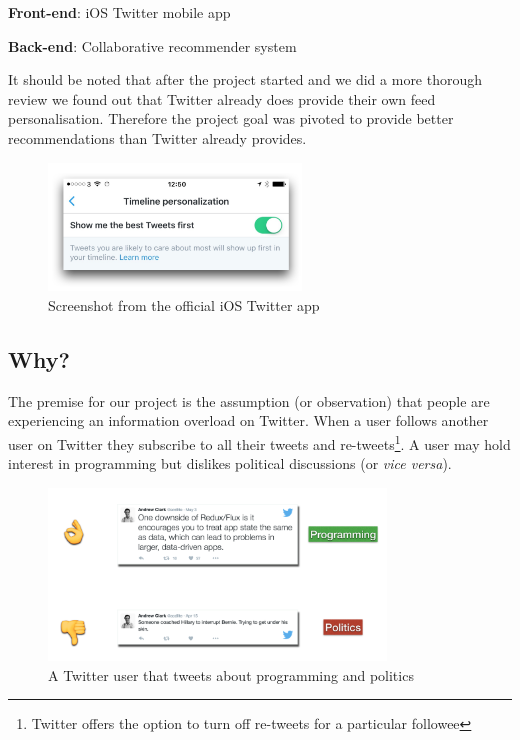 \documentclass{article}
\begin{document}
\begin{itemize*}
	\item \textbf{Front-end}: iOS Twitter mobile app
	\item \textbf{Back-end}: Collaborative recommender system
\end{itemize*}

\noindent It should be noted that after the project started and we did a more thorough review we found out that Twitter already does provide their own feed personalisation. Therefore the project goal was pivoted to provide better recommendations than Twitter already provides.

\begin{figure}[H]
    \centering
    \includegraphics[width=0.6\textwidth]{tp}  
    \caption{Screenshot from the official iOS Twitter app}
\end{figure}


\subsection{Why?}
The premise for our project is the assumption (or observation) that people are experiencing an information overload on Twitter. When a user follows another user on Twitter they subscribe to all their tweets and re-tweets\footnote{Twitter offers the option to turn off re-tweets for a particular followee}. A user may hold interest in programming but dislikes political discussions (or \textit{vice versa}).

\begin{figure}[H]
    \centering
    \includegraphics[width=0.8\textwidth]{the_problem}  
    \caption{A Twitter user that tweets about programming and politics}
\end{figure}
\end{document}
